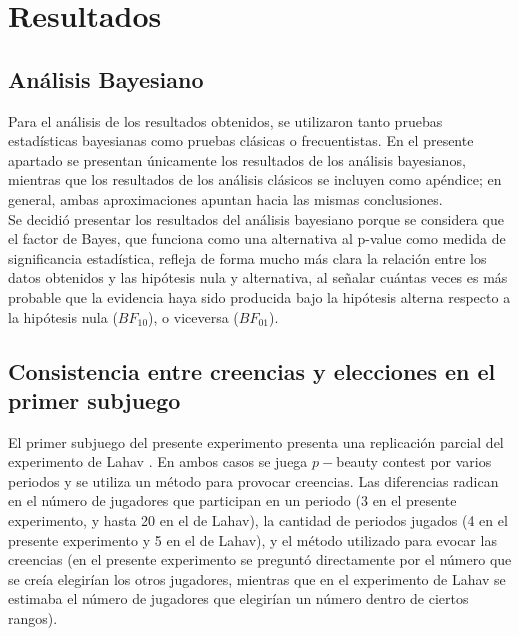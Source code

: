 
\chapter{Resultados} %
\label{Cap_Res} %

\section{Análisis Bayesiano}

Para el análisis de los resultados obtenidos, se utilizaron tanto pruebas estadísticas bayesianas como pruebas clásicas o frecuentistas. En el presente apartado se presentan únicamente los resultados de los análisis bayesianos, mientras que los resultados de los análisis clásicos se incluyen como apéndice; en general, ambas aproximaciones apuntan hacia las mismas conclusiones.\\

Se decidió presentar los resultados del análisis bayesiano porque se considera que el factor de Bayes, que funciona como una alternativa al p-value como medida de significancia estadística, refleja de forma mucho más clara la  relación entre los datos obtenidos y las hipótesis nula y alternativa, al señalar cuántas veces es más probable que la evidencia haya sido producida bajo la hipótesis alterna respecto a la hipótesis nula ($BF_{10}$), o viceversa ($BF_{01}$).

\section{Consistencia entre creencias y elecciones en el primer subjuego}

El primer subjuego del presente experimento presenta una replicación parcial del experimento de Lahav \parencite*{Lahav2015}. En ambos casos se juega $p-$beauty contest por varios periodos y se utiliza un método para provocar creencias. Las diferencias radican en el número de jugadores que participan en un periodo (3 en el presente experimento, y hasta 20 en el de Lahav), la cantidad de periodos jugados (4 en el presente experimento y 5 en el de Lahav), y el método utilizado para evocar las creencias (en el presente experimento se preguntó directamente por el número que se creía elegirían los otros jugadores, mientras que en el experimento de Lahav se estimaba el número de jugadores que elegirían un número dentro de ciertos rangos).\\

